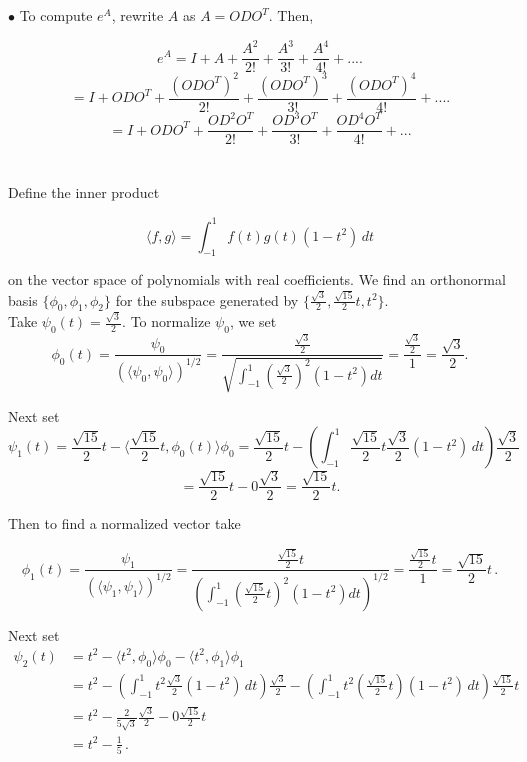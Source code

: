 \documentclass[11pt]{article}
\begin{document}
$\bullet$ To compute $e^A$, rewrite $A$ as $A = ODO^T$. Then,

$$e^A = I + A + \frac{A^2}{2!} + \frac{A^3}{3!} + \frac{A^4}{4!} + ....$$
$$ = I + ODO^T + \frac{(ODO^T)^2}{2!} + \frac{(ODO^T)^3}{3!} + \frac{(ODO^T)^4}{4!} + ....$$
$$ = I + ODO^T + \frac{OD^2O^T}{2!} + \frac{OD^3O^T}{3!} + \frac{OD^4O^T}{4!} + ...$$

\section{}

Define the inner product

$$\langle f, g \rangle = \int_{-1}^1 f(t)g(t)(1-t^2) \, dt$$

on the vector space of polynomials with real coefficients. We find an orthonormal basis $\{\phi_0, \phi_1, \phi_2\}$ for the subspace generated by $\{\frac{\sqrt{3}}{2}, \frac{\sqrt{15}}{2}t, t^2\}$. \\

Take $\psi_0(t) =  \frac{\sqrt{3}}{2}$. To normalize $\psi_0$, we set $$\phi_0(t) = \frac{\psi_0}{(\langle \psi_0, \psi_0\rangle)^{1/2}} = \frac{\frac{\sqrt{3}}{2}}{\sqrt{\int_{-1}^1 (\frac{\sqrt{3}}{2})^2(1-t^2)dt}}= \frac{\frac{\sqrt{3}}{2}}{1} = \frac{\sqrt{3}}{2}.$$

Next set $$\psi_1(t) = \frac{\sqrt{15}}{2}t - \langle \frac{\sqrt{15}}{2}t, \phi_0(t) \rangle \phi_0 = \frac{\sqrt{15}}{2}t - \left(\int_{-1}^1 \frac{\sqrt{15}}{2}t\frac{\sqrt{3}}{2}(1-t^2) \, dt\right)\frac{\sqrt{3}}{2} $$ $$= \frac{\sqrt{15}}{2}t - 0\frac{\sqrt{3}}{2} = \frac{\sqrt{15}}{2}t.$$ 

Then to find a normalized vector take

$$\phi_1(t) = \frac{\psi_1}{(\langle \psi_1, \psi_1\rangle)^{1/2}} = \frac{\frac{\sqrt{15}}{2}t}{\left(\int_{-1}^1 (\frac{\sqrt{15}}{2}t)^2(1-t^2) dt\right)^{1/2}} = \frac{\frac{\sqrt{15}}{2}t}{1}  = \frac{\sqrt{15}}{2}t \,.$$

Next set\begin{align*}
\psi_2(t) &= t^2 - \langle t^2, \phi_0 \rangle \phi_0 - \langle t^2, \phi_1 \rangle \phi_1\\
&= t^2 - \left(\int_{-1}^1 t^2\frac{\sqrt{3}}{2}(1-t^2) \, dt\right)\frac{\sqrt{3}}{2} - \left(\int_{-1}^1 t^2(\frac{\sqrt{15}}{2}t)(1-t^2) \, dt\right) \frac{\sqrt{15}}{2}t\\
&= t^2 - \frac{2}{5\sqrt{3}}\frac{\sqrt{3}}{2} - 0 \frac{\sqrt{15}}{2}t\\
&= t^2 -\frac{1}{5}\,.
\end{align*}
\end{document}
